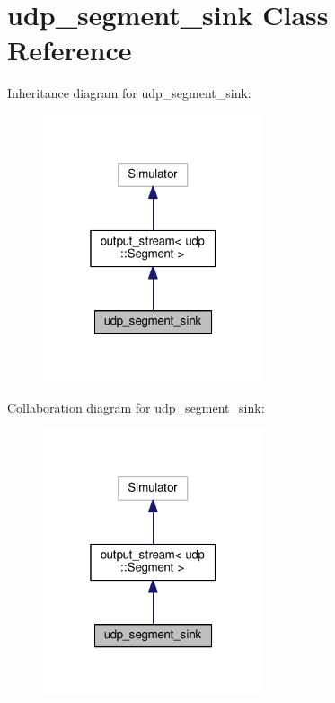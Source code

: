 \hypertarget{classudp__segment__sink}{}\section{udp\+\_\+segment\+\_\+sink Class Reference}
\label{classudp__segment__sink}


Inheritance diagram for udp\+\_\+segment\+\_\+sink\+:\nopagebreak
\begin{figure}[H]
\begin{center}
\leavevmode
\includegraphics[width=184pt]{classudp__segment__sink__inherit__graph}
\end{center}
\end{figure}


Collaboration diagram for udp\+\_\+segment\+\_\+sink\+:\nopagebreak
\begin{figure}[H]
\begin{center}
\leavevmode
\includegraphics[width=184pt]{classudp__segment__sink__coll__graph}
\end{center}
\end{figure}
